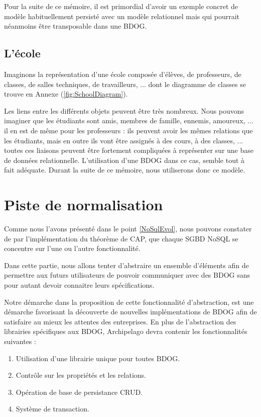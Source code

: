 \documentclass[a4paper,fleqn,12pt,oneside]{book}
\begin{document}
Pour la suite de ce mémoire, il est primordial d'avoir un exemple concret de modèle habituellement persisté avec un modèle relationnel mais qui pourrait néanmoins être transposable dans une BDOG.

\subsection*{L'école}

Imaginons la représentation d'une école composée d'élèves, de professeurs, de classes, de salles techniques, de travailleurs, ... dont le diagramme de classes se trouve en Annexe (\ref{fig:SchoolDiagram}).

Les liens entre les différents objets peuvent être très nombreux. Nous pouvons imaginer que les étudiants sont amis, membres de famille, ennemis, amoureux, ... il en est de même pour les professeurs : ils peuvent avoir les mêmes relations que les étudiants, mais en outre ils vont être assignés à des cours, à des classes, ... toutes ces liaisons peuvent être fortement compliquées à représenter sur une base de données relationnelle. L'utilisation d'une BDOG dans ce cas, semble tout à fait adéquate. Durant la suite de ce mémoire, nous utiliserons donc ce modèle.



\section{Piste de normalisation} 
Comme nous l'avons présenté dans le point \ref{NoSqlEvol}, nous pouvons constater de par l'implémentation du théorème de CAP, que chaque SGBD NoSQL se concentre sur l'une ou l'autre fonctionnalité. 

Dans cette partie, nous allons tenter d'abstraire un ensemble d'éléments afin de permettre aux futurs utilisateurs de pouvoir communiquer avec des BDOG sans pour autant devoir connaitre leurs spécifications. 

Notre démarche dans la proposition de cette fonctionnalité d'abstraction, est une démarche favorisant la découverte de nouvelles implémentations de BDOG afin de satisfaire au mieux les attentes des entreprises. En plus de l'abstraction des librairies spécifiques aux BDOG, Archipelago devra contenir les fonctionnalités suivantes :
 
\begin{enumerate}
\item Utilisation d'une librairie unique pour toutes BDOG.
\item Contrôle sur les propriétés et les relations.
\item Opération de base de persistance CRUD.
\item Système de transaction.
\end{enumerate}
\end{document}

